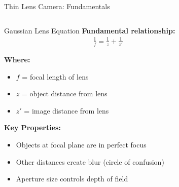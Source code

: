 \begin{frame}{Thin Lens Camera: Fundamentals}
    \begin{columns}
        \begin{column}{0.5\textwidth}
            \begin{mathbox}{Gaussian Lens Equation}
                \textbf{Fundamental relationship:}
                \begin{align}
                    \frac{1}{f} = \frac{1}{z} + \frac{1}{z'}
                \end{align}

                \textbf{Where:}
                \begin{itemize}
                    \item $f$ = focal length of lens
                    \item $z$ = object distance from lens
                    \item $z'$ = image distance from lens
                \end{itemize}

                \vspace{0.3cm}
                \textbf{Key Properties:}
                \begin{itemize}
                    \item Objects at focal plane are in perfect focus
                    \item Other distances create blur (circle of confusion)
                    \item Aperture size controls depth of field
                \end{itemize}
            \end{mathbox}
        \end{column}
        \begin{column}{0.5\textwidth}
\end{column}
\end{columns}
\end{frame}
